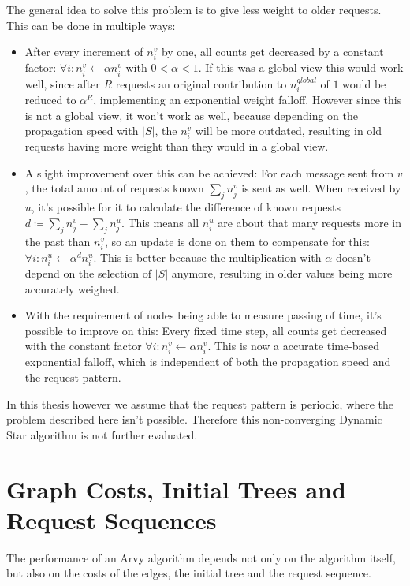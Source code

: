 \documentclass[a4paper, oneside]{discothesis}
\begin{document}
The general idea to solve this problem is to give less weight to older requests. This can be done in multiple ways:
\begin{itemize}
\item After every increment of $n_i^v$ by one, all counts get decreased by a constant factor: $\forall i:n_i^v\gets \alpha n_i^v$ with $0<\alpha<1$. If this was a global view this would work well, since after $R$ requests an original contribution to $n_i^{global}$ of $1$ would be reduced to $\alpha^R$, implementing an exponential weight falloff. However since this is not a global view, it won't work as well, because depending on the propagation speed with $|S|$, the $n_i^v$ will be more outdated, resulting in old requests having more weight than they would in a global view.
\item A slight improvement over this can be achieved: For each message sent from $v$, the total amount of requests known $\sum_jn_j^v$ is sent as well. When received by $u$, it's possible for it to calculate the difference of known requests $d\coloneqq\sum_jn_j^v-\sum_jn_j^u$. This means all $n_i^u$ are about that many requests more in the past than $n_i^v$, so an update is done on them to compensate for this: $\forall i:n_i^u\gets\alpha^dn_i^u$. This is better because the multiplication with $\alpha$ doesn't depend on the selection of $|S|$ anymore, resulting in older values being more accurately weighed.
\item With the requirement of nodes being able to measure passing of time, it's possible to improve on this: Every fixed time step, all counts get decreased with the constant factor $\forall i:n_i^v\gets \alpha n_i^v$. This is now a accurate time-based exponential falloff, which is independent of both the propagation speed and the request pattern.
\end{itemize}

In this thesis however we assume that the request pattern is periodic, where the problem described here isn't possible. Therefore this non-converging Dynamic Star algorithm is not further evaluated.

\chapter{Graph Costs, Initial Trees and Request Sequences}

The performance of an Arvy algorithm depends not only on the algorithm itself, but also on the costs of the edges, the initial tree and the request sequence.
\end{document}
